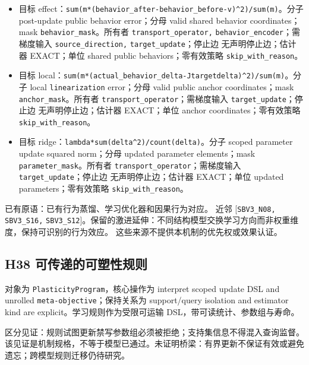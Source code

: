 \documentclass[
  10pt,
]{article}
\begin{document}
\begin{itemize}
\item
  目标
  effect：{\small\nolinkurl{sum(m*(behavior_after-behavior_before-v)^2)/sum(m)}}。分子
  post-update public behavior error；分母 valid shared behavior
  coordinates；mask \nolinkurl{behavior_mask}。所有者
  \nolinkurl{transport_operator,}
  \nolinkurl{behavior_encoder}；需梯度输入 \nolinkurl{source_direction,}
  \nolinkurl{target_update}；停止边 无声明停止边；估计器 EXACT；单位
  shared public behaviors；零有效策略 \nolinkurl{skip_with_reason}。
\item
  目标
  local：{\small\nolinkurl{sum(m*(actual_behavior_delta-Jtarget}\hspace{0.333em}\nolinkurl{delta)^2)/sum(m)}}。分子
  local \nolinkurl{linearization} error；分母 valid public anchor
  coordinates；mask \nolinkurl{anchor_mask}。所有者
  \nolinkurl{transport_operator}；需梯度输入
  \nolinkurl{target_update}；停止边 无声明停止边；估计器 EXACT；单位
  anchor coordinates；零有效策略 \nolinkurl{skip_with_reason}。
\item
  目标
  ridge：{\small\nolinkurl{lambda}\hspace{0.333em}\nolinkurl{*}\hspace{0.333em}\nolinkurl{sum(delta^2)/count(delta)}}。分子
  scoped parameter update squared norm；分母 updated parameter
  elements；mask \nolinkurl{parameter_mask}。所有者
  \nolinkurl{transport_operator}；需梯度输入
  \nolinkurl{target_update}；停止边 无声明停止边；估计器 EXACT；单位
  updated parameters；零有效策略 \nolinkurl{skip_with_reason}。
\end{itemize}

已有原语：已有行为蒸馏、学习优化器和因果行为对应。 近邻
{[}\nolinkurl{SBV3_N08,} \nolinkurl{SBV3_S16,}
\nolinkurl{SBV3_S12}{]}。保留的激进延伸：不同结构模型交换学习方向而非权重维度，保持可识别的行为效应。
这些来源不提供本机制的优先权或效果认证。

\subsection{H38
可传递的可塑性规则}\label{h38-ux53efux4f20ux9012ux7684ux53efux5851ux6027ux89c4ux5219}

对象为 \nolinkurl{PlasticityProgram}，核心操作为 interpret scoped update
DSL and unrolled \nolinkurl{meta-objective}；保持关系为 support/query
isolation and estimator kind are explicit。学习规则作为受限可运输
DSL，带可读统计、参数组与寿命。

区分见证：规则试图更新禁写参数组必须被拒绝；支持集信息不得混入查询监督。
该见证是机制规格，不等于模型已通过。未证明桥梁：有界更新不保证有效或避免遗忘；跨模型规则迁移仍待研究。
\end{document}
